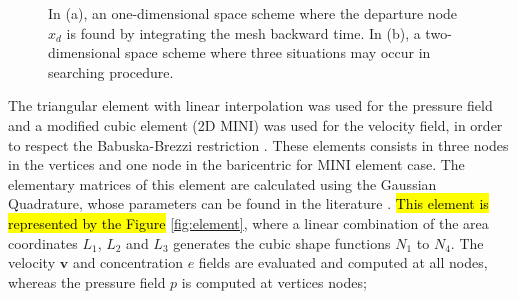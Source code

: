 \documentclass[10pt,fleqn,a4paper,twoside]{article}
\begin{document}
\begin{figure}[H]
\begin{center}
\end{center}
\caption{In (a), an one-dimensional space scheme
 where the departure node $x_{d}$ is found by integrating the 
mesh backward time. In (b), a two-dimensional space scheme
where three situations may occur in searching procedure.}
\label{semi-lagrangian figure}
\end{figure}

\medskip
The triangular element with linear interpolation was used
for the pressure field and a modified cubic element 
(2D MINI) was used
for the velocity field, 
in order to respect the Babuska-Brezzi restriction
\cite{babuska1971}\cite{brezzi1974}.
These elements consists in three nodes in the vertices
and one node in the baricentric for MINI element case.
The elementary matrices of 
this element are calculated using the Gaussian Quadrature, 
whose parameters can be found in the literature \cite{cowper1973}. 
\hl{This element is represented by the Figure} \ref{fig:element},
\noindent
where
a linear combination of the area
coordinates
$L_1$,
$L_2$ and
$L_3$
generates the cubic shape functions
$N_1$ to $N_4$.
The velocity $\textbf{v}$ and
concentration $e$ fields
are evaluated and computed at all nodes, whereas
the pressure field $p$ is computed at vertices nodes; 
\end{document}
